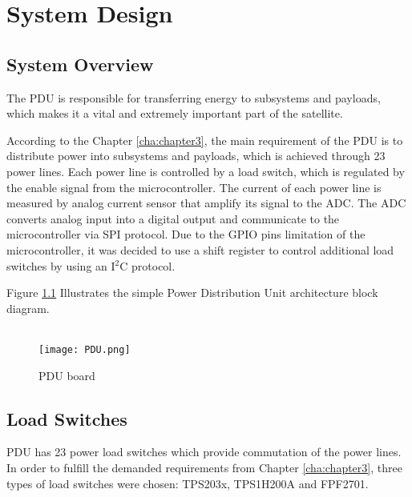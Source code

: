 \chapter{System Design\label{sec:tech77}}

\section{System Overview}
The PDU is responsible for transferring energy to subsystems and payloads, which makes it a vital and extremely important part of the satellite. 

 According to the Chapter \ref{cha:chapter3}, the main requirement of the PDU is to distribute power into subsystems and payloads, which is achieved through 23 power lines. Each power line is controlled by a load switch, which is regulated by the enable signal from the microcontroller. The current of each power line is measured by analog current sensor that amplify its signal to the ADC. The ADC converts analog input into a digital output and communicate to the microcontroller via SPI protocol. Due to the GPIO pins limitation of the microcontroller, it was decided to use a shift register to control additional load switches by using an I$^2$C protocol. 
 
 
  Figure \ref{fig: PDU} Illustrates the simple Power Distribution Unit architecture block diagram.\\ \\


 \begin{figure}[h]
 	\centering
 	\texttt{[image: PDU.png]}
 	\caption{PDU board}
 	\label{fig: PDU}
 \end{figure} 

\section{Load Switches}
PDU has 23 power load switches which provide commutation of the power lines. In order to fulfill the demanded requirements from Chapter \ref{cha:chapter3}, three types of load switches were chosen: TPS203x, TPS1H200A and FPF2701. 

